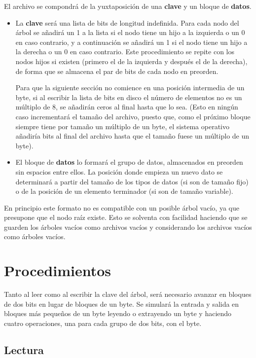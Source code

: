 \documentclass{article}
\begin{document}
El archivo se compondrá de la yuxtaposición de una \textbf{clave} y un
bloque de \textbf{datos}.

\begin{itemize}
	\item La \textbf{clave} será una lista de bits de longitud indefinida.
  Para cada nodo del árbol se añadirá un 1 a la lista si el nodo tiene un hijo a
  la izquierda o un 0 en caso contrario, y a continuación se añadirá un 1 si el
  nodo tiene un hijo a la derecha o un 0 en caso contrario. Este procedimiento
  se repite con los nodos hijos si existen (primero el de la izquierda y después
  el de la derecha), de forma que se almacena el par de bits de cada nodo en preorden.

  Para que la siguiente sección no comience en una posición intermedia de un byte,
  si al escribir la lista de bits en disco el número de elementos no es un múltiplo
  de 8, se añadirán ceros al final hasta que lo sea. (Esto en ningún caso
  incrementará el tamaño del archivo, puesto que, como el próximo bloque siempre
  tiene por tamaño un múltiplo de un byte, el sistema operativo añadiría bits al
  final del archivo hasta que el tamaño fuese un múltiplo de un byte).
	\item El bloque de \textbf{datos} lo formará el grupo de datos, almacenados
  en preorden sin espacios entre ellos. La posición donde empieza un nuevo dato
  se determinará a partir del tamaño de los tipos de datos (si son de tamaño fijo)
  o de la posición de un elemento terminador (si son de tamaño variable).
\end{itemize}

En principio este formato no es compatible con un posible árbol vacío, ya que
presupone que el nodo raíz existe. Esto se solventa con facilidad haciendo que se
guarden los árboles vacíos como archivos vacíos y considerando los archivos vacíos
como árboles vacíos. 

\section{Procedimientos}

Tanto al leer como al escribir la clave del árbol, será necesario avanzar en 
bloques de dos bits en lugar de bloques de un byte. Se simulará la entrada y salida
en bloques más pequeños de un byte leyendo o extrayendo un byte y haciendo cuatro
operaciones, una para cada grupo de dos bits, con el byte.

\subsection{Lectura}
\end{document}
